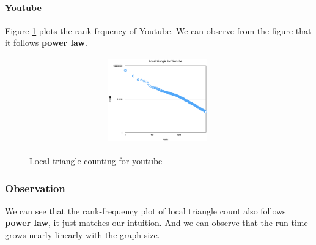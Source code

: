 \paragraph{Youtube}
Figure \ref{t7:youtube} plots the rank-frquency of Youtube. We can observe from the figure that it follows {\bf power law}. 
\begin{figure}[!htbf]
\begin{center}
\begin{tabular}{c}
     \includegraphics[width=0.4\textwidth]{FIG/t7_youtube.png}
\end{tabular}
\caption{Local triangle counting for youtube}
\label{t7:youtube}
\end{center}
\end{figure}


\subsubsection{Observation}
We can see that the rank-frequency plot of local triangle count also follows {\bf power law}, it just matches our intuition. And we can observe that the run time grows nearly linearly with the graph size. 

